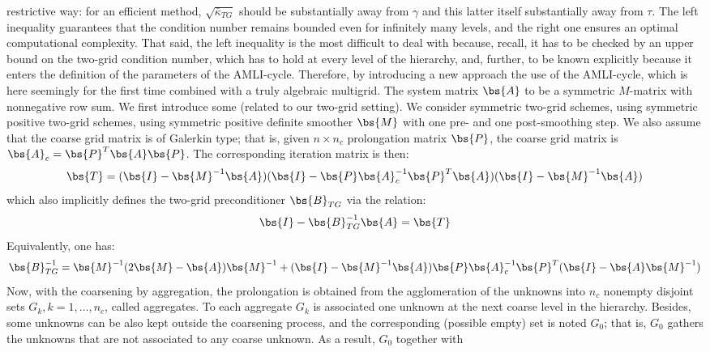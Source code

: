 restrictive way: for an efficient method, $\sqrt{\bar{\kappa}_{TG}}$ should be
substantially away from $\gamma$ and this latter itself substantially away
from $\tau$. The left inequality guarantees that the condition number remains
bounded even for infinitely many levels, and the right one ensures an optimal
computational complexity. That said, the left inequality is the most difficult
to deal with because, recall, it has to be checked by an upper bound on the
two-grid condition number, which has to hold at every level of the hierarchy,
and, further, to be known explicitly because it enters the definition of the
parameters of the AMLI-cycle. Therefore, by introducing a new approach the use
of the AMLI-cycle, which is here seemingly for the first time combined with a
truly algebraic multigrid. The system matrix $\bs{A}$ to be a symmetric
$M$-matrix with nonnegative row sum. We first introduce some (related to our
two-grid setting). We consider symmetric two-grid schemes, using symmetric
positive two-grid schemes, using symmetric positive definite smoother $\bs{M}$
with one pre- and one post-smoothing step. We also assume that the coarse grid
matrix is of Galerkin type; that is, given $n \times n_c$ prolongation matrix
$\bs{P}$, the coarse grid matrix is $\bs{A}_c = \bs{P}^T \bs{A} \bs{P}$. The
corresponding iteration matrix is then:
\begin{equation}
\bs{T} = (\bs{I}-\bs{M}^{-1} \bs{A}) (\bs{I}-\bs{P}\bs{A}_c^{-1}\bs{P}^T
\bs{A}) (\bs{I}-\bs{M}^{-1} \bs{A})
\end{equation}
which also implicitly defines the two-grid preconditioner $\bs{B}_{TG}$ via
the relation:
\begin{equation}
\bs{I}-\bs{B}_{TG}^{-1}\bs{A}=\bs{T}
\end{equation}
Equivalently, one has:
\begin{equation}
\bs{B}_{TG}^{-1} = \bs{M}^{-1} (2\bs{M} - \bs{A}) \bs{M}^{-1} +
(\bs{I}-\bs{M}^{-1} \bs{A}) \bs{P} \bs{A}_c^{-1} \bs{P}^T
(\bs{I}-\bs{A}\bs{M}^{-1})
\end{equation}
Now, with the coarsening by aggregation, the prolongation is obtained from the
agglomeration of the unknowns into $n_c$ nonempty disjoint sets $G_k,
k=1,\hdots,n_c$, called aggregates. To each aggregate $G_k$ is associated one
unknown at the next coarse level in the hierarchy. Besides, some unknowns can
be also kept outside the coarsening process, and the corresponding (possible
empty) set is noted $G_0$; that is, $G_0$ gathers the unknowns that are not
associated to any coarse unknown. As a result, $G_0$ together with
